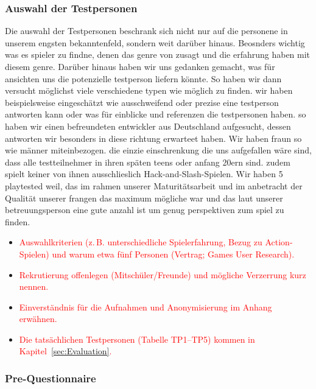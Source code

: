 \documentclass[../Main.tex]{subfiles}
\begin{document}
\subsubsection{Auswahl der Testpersonen} \label{sec:AuswahlTP}
Die auswahl der Testpersonen beschrank sich nicht nur auf die personene in unserem engsten bekanntenfeld, sondern weit darüber hinaus. Beosnders wichtig was es spieler zu findne, denen das genre von  zusagt und die erfahrung haben mit diesem genre. Darüber hinaus haben wir uns gedanken gemacht, was für ansichten uns die potenzielle testperson liefern könnte. So haben wir dann versucht möglichst viele verschiedene typen wie möglich zu finden. wir haben beispielsweise eingeschätzt wie ausschweifend oder prezise eine testperson antworten kann oder was für einblicke und referenzen die testpersonen haben. so haben wir einen befreundeten entwickler aus Deutschland aufgesucht, dessen antworten wir besonders in diese richtung erwarteet haben. Wir haben fraun so wie männer miteinbezogen. die einzie einschrenkung die uns aufgefallen wäre sind, dass alle testteilnehmer in ihren späten teens oder anfang 20ern sind. zudem spielt keiner von ihnen ausschlieslich Hack-and-Slash-Spielen. Wir haben 5 playtested weil, das im rahmen unserer Maturitätsarbeit und im anbetracht der Qualität unserer frangen das maximum mögliche war und das laut unserer betreuungsperson eine gute anzahl ist um genug perspektiven zum spiel zu finden.

\begin{itemize}[leftmargin=1.5cm]
    \item \textcolor{red}{Auswahlkriterien (z.\,B. unterschiedliche Spielerfahrung, Bezug zu Action-Spielen) und warum etwa fünf Personen (Vertrag; Games User Research).}
    \item \textcolor{red}{Rekrutierung offenlegen (Mitschüler/Freunde) und mögliche Verzerrung kurz nennen.}
    \item \textcolor{red}{Einverständnis für die Aufnahmen und Anonymisierung im Anhang erwähnen.}
    \item \textcolor{red}{Die tatsächlichen Testpersonen (Tabelle TP1--TP5) kommen in Kapitel~\ref{sec:Evaluation}.}
\end{itemize}

\subsubsection{Pre-Questionnaire} \label{sec:PreQuestionnaire}
\end{document}
